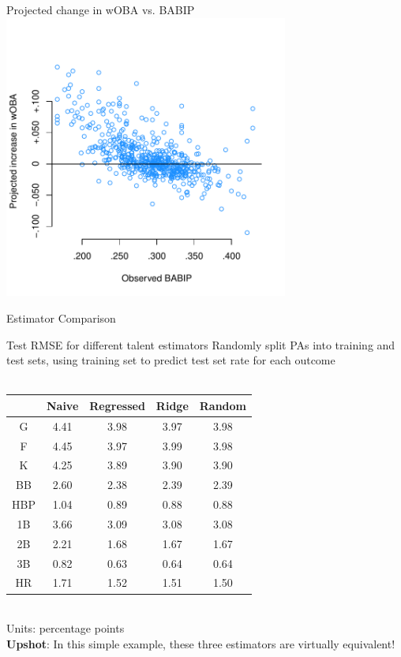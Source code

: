 \documentclass{beamer}
\begin{document}
\begin{frame}{Projected change in wOBA vs. BABIP}
\centering
\includegraphics[width = 0.7\textwidth]{../figs/woba-v-babip-slides.pdf}
\end{frame}

\begin{frame}
\centering\LARGE Estimator Comparison
\end{frame}

\begin{frame}{Test RMSE for different talent estimators}
Randomly split PAs into training and test sets, using training set to predict
test set rate for each outcome\\~\\
\centering
\begin{tabular}{c|cccc}
    & Naive & Regressed & Ridge & Random\\
    \hline
G   & 4.41  & 3.98      & 3.97  & 3.98\\
F   & 4.45  & 3.97      & 3.99  & 3.98\\
K   & 4.25  & 3.89      & 3.90  & 3.90\\
BB  & 2.60  & 2.38      & 2.39  & 2.39\\
HBP & 1.04  & 0.89      & 0.88  & 0.88\\
1B  & 3.66  & 3.09      & 3.08  & 3.08\\
2B  & 2.21  & 1.68      & 1.67  & 1.67\\
3B  & 0.82  & 0.63      & 0.64  & 0.64\\
HR  & 1.71  & 1.52      & 1.51  & 1.50
\end{tabular}\\
{\scriptsize Units: percentage points}\\
{\bf Upshot}: In this simple example, these three estimators are virtually
equivalent!
\end{frame}
\end{document}
